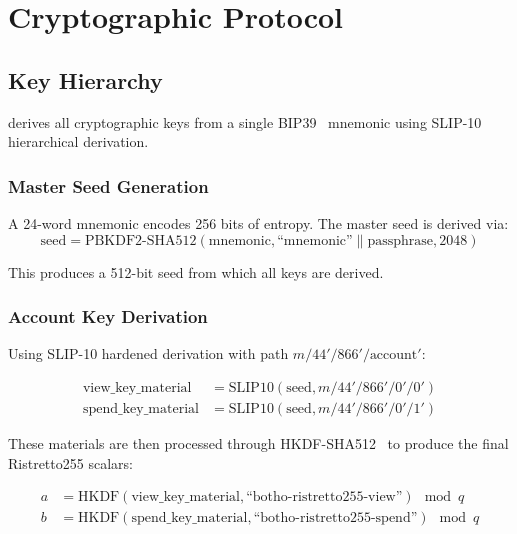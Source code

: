 
\section{Cryptographic Protocol}
\label{sec:cryptography}

\subsection{Key Hierarchy}

\Botho derives all cryptographic keys from a single BIP39~\cite{bip39}
mnemonic using SLIP-10~\cite{slip10} hierarchical derivation.

\subsubsection{Master Seed Generation}

A 24-word mnemonic encodes 256 bits of entropy. The master seed is derived
via:
\begin{equation}
\text{seed} = \text{PBKDF2-SHA512}(\text{mnemonic}, \text{``mnemonic''} \| \text{passphrase}, 2048)
\end{equation}

This produces a 512-bit seed from which all keys are derived.

\subsubsection{Account Key Derivation}

Using SLIP-10 hardened derivation with path $m/44'/866'/\text{account}'$:

\begin{align}
\text{view\_key\_material} &= \text{SLIP10}(\text{seed}, m/44'/866'/0'/0') \\
\text{spend\_key\_material} &= \text{SLIP10}(\text{seed}, m/44'/866'/0'/1')
\end{align}

These materials are then processed through HKDF-SHA512~\cite{rfc5869} to produce the
final Ristretto255 scalars:

\begin{align}
a &= \text{HKDF}(\text{view\_key\_material}, \text{``botho-ristretto255-view''}) \mod q \\
b &= \text{HKDF}(\text{spend\_key\_material}, \text{``botho-ristretto255-spend''}) \mod q
\end{align}


